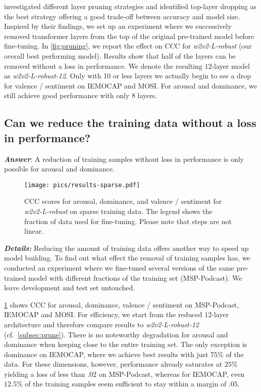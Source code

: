 \documentclass{article}
\newcommand\wrobust{\mbox{\emph{w2v2-L-robust}}}
\newcommand\wrobustpruned{\mbox{\emph{w2v2-L-robust-12}}}
\newcommand\msppodcast{\mbox{MSP-Podcast}}
\newcommand\iemocap{\mbox{IEMOCAP}}
\newcommand\mosi{\mbox{MOSI}}
\newcommand{\cf}{{cf.\ }}
\begin{document}
\citet{sajjad2021poor} investigated different layer pruning strategies
and identified top-layer dropping as the best strategy offering a good trade-off between accuracy and model size. 
Inspired by their findings,
we set up an experiment where we successively removed transformer layers from the top of the original pre-trained model before fine-tuning. 
In \cref{fig:pruning}, we report the effect on CCC for {\wrobust} (our overall best performing model). 
Results show that half of the layers can be removed without a loss in performance. 
We denote the resulting $12$-layer model as {\wrobustpruned}.
Only with 10 or less layers we actually begin to see a drop for valence / sentiment on {\iemocap} and {\mosi}. 
For arousal and dominance, we still achieve good performance with only $8$ layers.





\subsection{Can we reduce the training data without a loss in performance?}
\label{subsec:data_reduction}

\emph{\textbf{Answer}}:
A reduction of training samples without loss in performance is only possible for arousal and dominance.

\begin{figure}[t]
    \centering
    \texttt{[image: pics/results-sparse.pdf]}
    \caption{
        \ac{CCC} scores for arousal, dominance, and valence / sentiment for \emph{\wrobust} on sparse training data.
        The legend shows the fraction of data used for fine-tuning.
        Please note that steps are not linear.
    }
    \label{fig:sparse}
\end{figure}

\noindent
\emph{\textbf{Details:}}
Reducing the amount of training data offers another way to speed up model building. 
To find out what effect the removal of training samples has,
we conducted an experiment where we fine-tuned several versions of the same pre-trained model
with different fractions of the training set ({\msppodcast}). 
We leave development and test set untouched.

\cref{fig:sparse} shows \ac{CCC}
for arousal, dominance, valence / sentiment on {\msppodcast}, {\iemocap} and {\mosi}.
For efficiency, we start from the reduced $12$-layer architecture and therefore compare results to {\wrobustpruned} (\cf \cref{subsec:prune}).
There is no noteworthy degradation for arousal and dominance when keeping close to the entire training set.
The only exception is dominance on {\iemocap}, where we achieve best results with just $75$\% of the data. 
For these dimensions, however, performance already saturates at $25$\% yielding a loss of less than $.02$ on {\msppodcast},
whereas for {\iemocap}, even $12.5$\% of the training samples seem sufficient to stay within a margin of $.05$.
\end{document}
